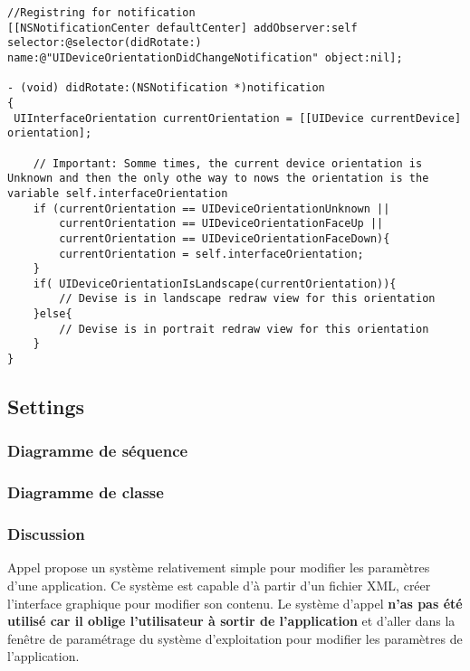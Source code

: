			\lstset{
			    style = Xcode,
			    caption=Code d'enregistrement pour la notification de rotation des appareils.,
			    breaklines=true,
			    frame=single
			}
		
			\begin{lstlisting}[name=Orientation did change notification  , label=SampleCode]
		//Registring for notification
[[NSNotificationCenter defaultCenter] addObserver:self selector:@selector(didRotate:) name:@"UIDeviceOrientationDidChangeNotification" object:nil];

- (void) didRotate:(NSNotification *)notification
{	
 UIInterfaceOrientation currentOrientation = [[UIDevice currentDevice] orientation];
    
    // Important: Somme times, the current device orientation is Unknown and then the only othe way to nows the orientation is the variable self.interfaceOrientation
    if (currentOrientation == UIDeviceOrientationUnknown ||
		currentOrientation == UIDeviceOrientationFaceUp ||
		currentOrientation == UIDeviceOrientationFaceDown){
		currentOrientation = self.interfaceOrientation;
    }
    if( UIDeviceOrientationIsLandscape(currentOrientation)){
		// Devise is in landscape redraw view for this orientation
	}else{
		// Devise is in portrait redraw view for this orientation
	}
}
		\end{lstlisting}
	\subsection{Settings}
		\subsubsection*{Diagramme de séquence}
			
		\subsubsection*{Diagramme de classe}
		\subsubsection*{Discussion}

		Appel propose un système relativement simple pour modifier les paramètres d'une application. Ce système est capable d'à partir d'un fichier XML, créer l'interface graphique pour modifier son contenu. Le système d'appel \textbf{n'as pas été utilisé car il oblige l'utilisateur à sortir de l'application }et d'aller dans la fenêtre de paramétrage du système d'exploitation pour modifier les paramètres de l'application.  
		
